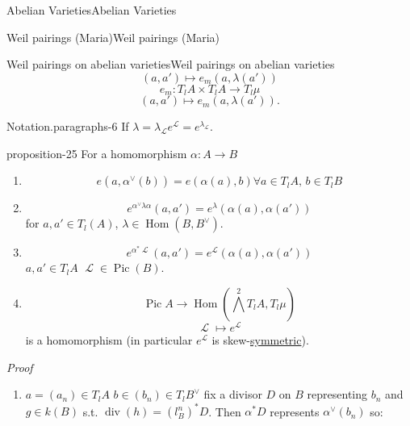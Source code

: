 \documentclass[10pt,]{book}
\makeatletter
\renewcommand*{\proofname}{Proof}
\renewenvironment{proof}[1][\proofname]{\par
  \pushQED{\qed}%
  \normalfont \topsep6\p@\@plus6\p@\relax
  \trivlist
  \item\relax
    {\itshape
    #1\@addpunct{.}}\hspace\labelsep\ignorespaces
}{%
  \popQED\endtrivlist\@endpefalse
}
\numberwithin{equation}{section}
\newcommand{\sheaf}[1]{\operatorname{\mathcal{#1}}}
\DeclareMathOperator{\Hom}{Hom}
\DeclareMathOperator{\divisor}{div}
\DeclareMathOperator{\Pic}{Pic}
\makeatother
\begin{document}
\begin{chapterptx}{Abelian Varieties}{}{Abelian Varieties}{}{}
\begin{sectionptx}{Weil pairings (Maria)}{}{Weil pairings (Maria)}{}{}
\begin{subsectionptx}{Weil pairings on abelian varieties}{}{Weil pairings on abelian varieties}{}{}
%
\begin{equation*}
(a,a') \mapsto e_m(a, \lambda(a'))
\end{equation*}
%
\begin{equation*}
e_m \colon T_lA\times T_l A \to T_l \mu
\end{equation*}
%
\begin{equation*}
(a,a') \mapsto e_m(a, \lambda(a'))\text{.}
\end{equation*}
%
\begin{paragraphs}{Notation.}{paragraphs-6}%
\hypertarget{p-305}{}%
If \(\lambda = \lambda_{\sheaf L} e^{\sheaf L} = e^{\lambda_{\sheaf L}}\).%
\end{paragraphs}%
\begin{proposition}{}{}{proposition-25}%
\hypertarget{p-306}{}%
For a homomorphism \(\alpha \colon A \to B\)\leavevmode%
\begin{enumerate}
\item\hypertarget{li-48}{}%
\begin{equation*}
e(a,\alpha^\vee(b)) = e(\alpha (a), b) \forall a \in T_lA,\,b\in T_l B
\end{equation*}
%
\item\hypertarget{li-49}{}%
\begin{equation*}
e^{\alpha^\vee \lambda \alpha}(a,a') = e ^\lambda (\alpha(a), \alpha(a'))
\end{equation*}
for \(a,a' \in T_l(A)\), \(\lambda \in \Hom(B,B^\vee)\).%
\item\hypertarget{li-50}{}%
\begin{equation*}
e^{\alpha^* \sheaf L} (a,a') = e^{\sheaf L}(\alpha (a),\alpha(a'))
\end{equation*}
\(a,a'\in T_lA\) \(\sheaf L\in \Pic(B)\).%
\item\hypertarget{li-51}{}%
\begin{equation*}
\Pic A  \to \Hom( \bigwedge^2 T_lA , T_l\mu)
\end{equation*}
%
\begin{equation*}
\sheaf L \mapsto e^{\sheaf L}
\end{equation*}
is a homomorphism (in particular \(e^{\sheaf L}\) is  skew-\hyperref[def-princ-pol]{symmetric}).%
\end{enumerate}
%
\end{proposition}
\begin{proof}\hypertarget{proof-49}{}
\hypertarget{p-307}{}%
\leavevmode%
\begin{enumerate}
\item\hypertarget{li-52}{}\(a = (a_n) \in T_lA\) \(b\in (b_n) \in T_l B^\vee\) fix a divisor \(D \) on \(B\) representing \(b_n\) and \(g\in k(B)\) s.t. \(\divisor (h) = (l^n_B)^* D\). Then \(\alpha^* D\) represents \(\alpha^\vee(b_n)\) so:%

\end{enumerate}
\end{proof}
\end{subsectionptx}
\end{sectionptx}
\end{chapterptx}
\end{document}

